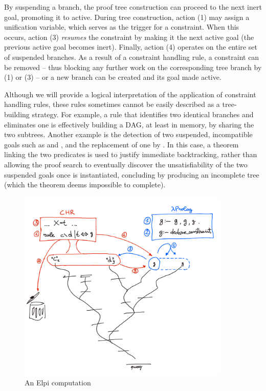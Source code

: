 \documentclass[a4paper, 11pt]{book}
\begin{document}
By suspending a branch, the proof tree construction can proceed to the next
inert goal, promoting it to active. During tree construction, action (1) may
assign a unification variable, which serves as the trigger for a constraint.
When this occurs, action (3) \emph{resumes} the constraint by making it the next
active goal (the previous active goal becomes inert).
Finally, action (4) operates on the entire set of suspended
branches. As a result of a constraint handling rule, a constraint can be
removed -- thus blocking any further work on the corresponding tree branch by (1)
or (3) -- or a new branch can be created and its goal made active.

Although we will provide a logical interpretation of the application of
constraint handling rules, these rules sometimes cannot be easily described as a
tree-building strategy. For example, a rule that identifies two identical
branches and eliminates one is effectively building a DAG, at least in memory, by
sharing the two subtrees. Another example is the detection of two suspended,
incompatible goals such as  and , and the replacement
of one by . In this case, a theorem linking the two predicates is
used to justify immediate backtracking, rather than allowing the proof search to
eventually discover the unsatisfiability of the two suspended goals once
 is instantiated, concluding by producing an incomplete tree (which the
theorem deems impossible to complete).

\begin{figure}[p]
  \begin{center}
    \includegraphics[width=0.9\textwidth]{chr.png}
    \caption{\label{fig:chr}An Elpi computation}
  \end{center}
\end{figure}
\end{document}
